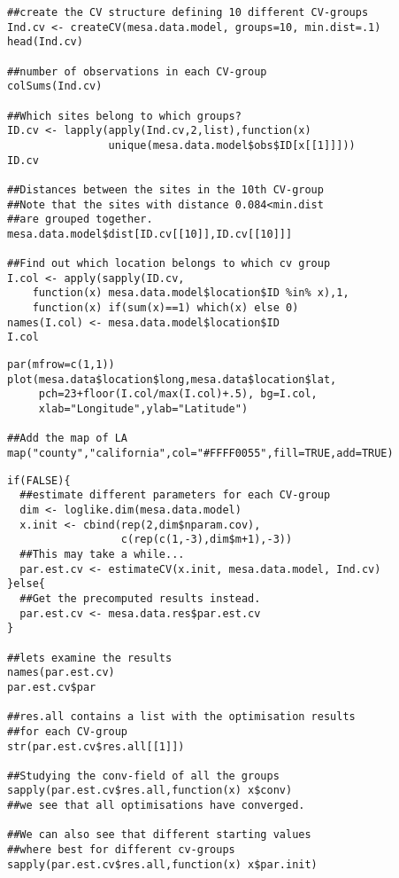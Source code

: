 \begin{verbatim}
##create the CV structure defining 10 different CV-groups
Ind.cv <- createCV(mesa.data.model, groups=10, min.dist=.1)
head(Ind.cv)

##number of observations in each CV-group
colSums(Ind.cv)

##Which sites belong to which groups?
ID.cv <- lapply(apply(Ind.cv,2,list),function(x) 
                unique(mesa.data.model$obs$ID[x[[1]]]))
ID.cv

##Distances between the sites in the 10th CV-group
##Note that the sites with distance 0.084<min.dist 
##are grouped together.
mesa.data.model$dist[ID.cv[[10]],ID.cv[[10]]]

##Find out which location belongs to which cv group
I.col <- apply(sapply(ID.cv,
    function(x) mesa.data.model$location$ID %in% x),1,
    function(x) if(sum(x)==1) which(x) else 0)
names(I.col) <- mesa.data.model$location$ID
I.col
\end{verbatim}
%
\vspace*{-1\baselineskip}
\begin{verbatim}
par(mfrow=c(1,1))
plot(mesa.data$location$long,mesa.data$location$lat,
     pch=23+floor(I.col/max(I.col)+.5), bg=I.col, 
     xlab="Longitude",ylab="Latitude")

##Add the map of LA
map("county","california",col="#FFFF0055",fill=TRUE,add=TRUE)
\end{verbatim}
\begin{verbatim}
if(FALSE){
  ##estimate different parameters for each CV-group
  dim <- loglike.dim(mesa.data.model)
  x.init <- cbind(rep(2,dim$nparam.cov),
                  c(rep(c(1,-3),dim$m+1),-3))
  ##This may take a while...
  par.est.cv <- estimateCV(x.init, mesa.data.model, Ind.cv)
}else{
  ##Get the precomputed results instead.
  par.est.cv <- mesa.data.res$par.est.cv
}

##lets examine the results
names(par.est.cv)
par.est.cv$par

##res.all contains a list with the optimisation results 
##for each CV-group
str(par.est.cv$res.all[[1]])

##Studying the conv-field of all the groups
sapply(par.est.cv$res.all,function(x) x$conv)
##we see that all optimisations have converged.

##We can also see that different starting values
##where best for different cv-groups 
sapply(par.est.cv$res.all,function(x) x$par.init)
\end{verbatim}
